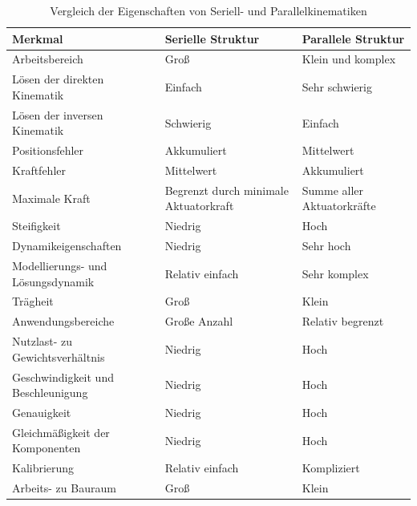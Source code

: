\documentclass[Bachelor, BMR, ngerman]{twbook}
\begin{document}
    \begin{table}[H]
        \centering
        \caption{Vergleich der Eigenschaften von Seriell- und Parallelkinematiken }\label{tab:gegenüberstellung-seriell-paralell}
            \begin{tabular}{| p{5.7cm} | C{4.5cm} | C{4.5cm} |}\hline 
                 Merkmal & Serielle Struktur & Parallele Struktur\\\hline
                Arbeitsbereich & Groß & Klein und komplex\\\hline
                Lösen der direkten Kinematik & Einfach & Sehr schwierig\\\hline 
                Lösen der inversen Kinematik & Schwierig & Einfach\\\hline 
                Positionsfehler & Akkumuliert & Mittelwert\\\hline
                Kraftfehler & Mittelwert & Akkumuliert\\\hline
                Maximale Kraft & Begrenzt durch minimale Aktuatorkraft & Summe aller Aktuatorkräfte\\\hline
                Steifigkeit & Niedrig & Hoch\\\hline
                Dynamikeigenschaften & Niedrig & Sehr hoch\\\hline 
                Modellierungs- und \newline Lösungsdynamik & Relativ einfach & Sehr komplex\\\hline
                Trägheit & Groß & Klein\\\hline
                Anwendungsbereiche & Große Anzahl & Relativ begrenzt\\\hline
                Nutzlast- zu Gewichtsverhältnis & Niedrig & Hoch\\\hline
                Geschwindigkeit und \newline Beschleunigung & Niedrig & Hoch\\\hline
                Genauigkeit & Niedrig & Hoch\\\hline
                Gleichmäßigkeit der \newline Komponenten & Niedrig & Hoch\\\hline
                Kalibrierung & Relativ einfach & Kompliziert\\\hline
                Arbeits- zu Bauraum & Groß & Klein\\\hline

\end{tabular}
\end{table}
\end{document}
